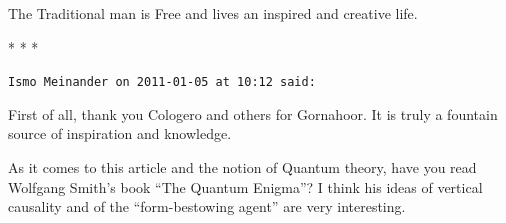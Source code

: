 The Traditional man is Free and lives an inspired and creative life.



\begin{center}* * *\end{center}

\begin{footnotesize}
\begin{sffamily}
\texttt{Ismo Meinander on 2011-01-05 at 10:12 said:}

First of all, thank you Cologero and others for Gornahoor. It is truly a fountain source of inspiration and knowledge.

As it comes to this article and the notion of Quantum theory, have you read Wolfgang Smith's book ``The Quantum Enigma''? I think his ideas of vertical causality and of the ``form-bestowing agent'' are very interesting.


\hfill

\end{sffamily}
\end{footnotesize}

